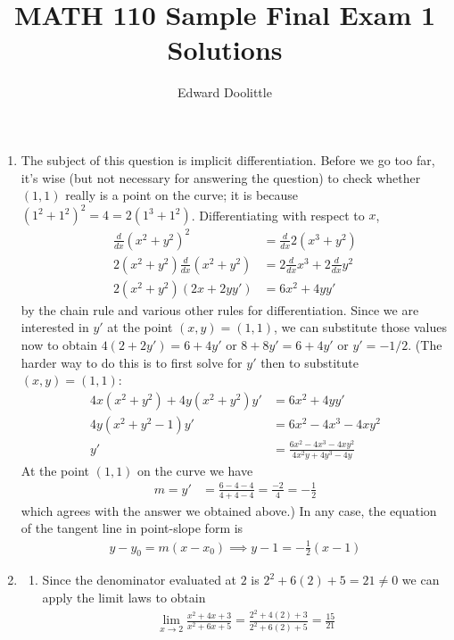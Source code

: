 \documentclass{article}
\title{MATH 110 Sample Final Exam 1 Solutions}
\author{Edward Doolittle}
\begin{document}
\maketitle

\begin{enumerate}
\item The subject of this question is implicit differentiation.  
  Before we go too far, it's wise (but not necessary for answering
  the question) to check whether $(1,1)$
  really is a point on the curve; it is because $(1^2+1^2)^2=4=2(1^3+1^2)$.
  Differentiating with respect to $x$,
  \begin{align*}
    \frac{d}{dx} (x^2+y^2)^2 &= \frac{d}{dx} 2(x^3+y^2) 
    \\
    2(x^2+y^2) \frac{d}{dx} (x^2+y^2) &= 2\frac{d}{dx} x^3 + 2\frac{d}{dx} y^2
    \\
    2(x^2+y^2) (2x+2yy') &= 6x^2 + 4yy'
  \end{align*}
  by the chain rule and various other rules for differentiation.  Since
  we are interested in $y'$ at the point $(x,y)=(1,1)$, we can substitute
  those values now to obtain $4(2+2y')=6+4y'$ or $8+8y'=6+4y'$ or $y'=-1/2$.
  (The harder way to do this is to first solve for $y'$ then to substitute
  $(x,y)=(1,1)$:
  \begin{align*}
    4x(x^2+y^2) + 4y(x^2+y^2) y' &= 6x^2 + 4yy'
    \\
    4y(x^2+y^2-1) y' &= 6x^2 - 4x^3 - 4xy^2
    \\
    y' &= \frac{6x^2 -4x^3-4xy^2}{4x^2y + 4y^3 - 4y}
  \end{align*}
  At the point $(1,1)$ on the curve we have
  \begin{align*}
    m= y' &= \frac{6-4-4}{4+4-4} = \frac{-2}{4} = -\frac{1}{2}
  \end{align*}
  which agrees with the answer we obtained above.)  In any case,
  the equation of the tangent line in point-slope form is
  \begin{align*}
    y-y_0 = m(x-x_0) \implies y-1 = -\frac{1}{2} (x-1)
  \end{align*}
\item 
  \begin{enumerate}
  \item Since the denominator evaluated at $2$ is $2^2+6(2)+5=21\ne 0$
    we can apply the limit laws to obtain
    \begin{align*}
      \lim_{x\to 2} \frac{x^2+4x+3}{x^2+6x+5}
      = \frac{2^2+4(2)+3}{2^2+6(2)+5}
      = \frac{15}{21}
    \end{align*}

\end{enumerate}
\end{enumerate}
\end{document}
